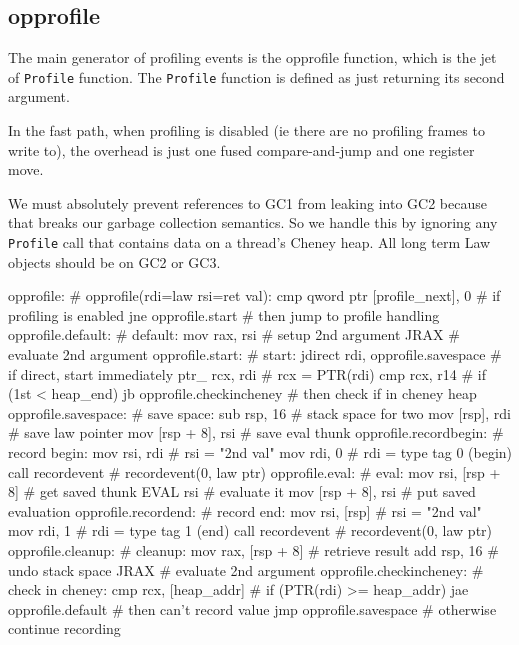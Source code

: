 \subsection{opprofile}

The main generator of profiling events is the opprofile function, which is the
jet of \lstinline|Profile| function. The \lstinline|Profile| function is
defined as just returning its second argument.

In the fast path, when profiling is disabled (ie there are no profiling frames
to write to), the overhead is just one fused compare-and-jump and one register
move.

We must absolutely prevent references to GC1 from leaking into GC2 because that
breaks our garbage collection semantics. So we handle this by ignoring any
\lstinline|Profile| call that contains data on a thread's Cheney heap. All
long term Law objects should be on GC2 or GC3.

\begin{asm}
opprofile:				    # opprofile(rdi=law rsi=ret val):
	cmp	qword ptr [profile_next], 0 #   if profiling is enabled
	jne	opprofile.start		    #   then jump to profile handling
opprofile.default:                          # default:
	mov	rax, rsi		    #   setup 2nd argument
	JRAX				    #   evaluate 2nd argument
opprofile.start:			    # start:
	jdirect	rdi, opprofile.savespace    #   if direct, start immediately
	ptr_	rcx, rdi                    #   rcx = PTR(rdi)
	cmp	rcx, r14                    #   if (1st < heap_end)
	jb	opprofile.checkincheney     #   then check if in cheney heap
opprofile.savespace:                        # save space:
	sub	rsp, 16			    #   stack space for two
	mov	[rsp], rdi		    #   save law pointer
	mov	[rsp + 8], rsi		    #   save eval thunk
opprofile.recordbegin:                      # record begin:
	mov	rsi, rdi		    #   rsi = "2nd val"
	mov	rdi, 0			    #   rdi = type tag 0 (begin)
	call	recordevent		    #   recordevent(0, law ptr)
opprofile.eval:				    # eval:
	mov	rsi, [rsp + 8]		    #   get saved thunk
	EVAL	rsi			    #   evaluate it
	mov	[rsp + 8], rsi		    #   put saved evaluation
opprofile.recordend:                        # record end:
	mov	rsi, [rsp]		    #   rsi = "2nd val"
	mov	rdi, 1			    #   rdi = type tag 1 (end)
	call	recordevent		    #   recordevent(0, law ptr)
opprofile.cleanup:                          # cleanup:
	mov	rax, [rsp + 8]		    #   retrieve result
	add	rsp, 16			    #   undo stack space
	JRAX				    #   evaluate 2nd argument
opprofile.checkincheney:                    # check in cheney:
	cmp	rcx, [heap_addr]            #   if (PTR(rdi) >= heap_addr)
	jae	opprofile.default           #   then can't record value
	jmp	opprofile.savespace         #   otherwise continue recording
\end{asm}

